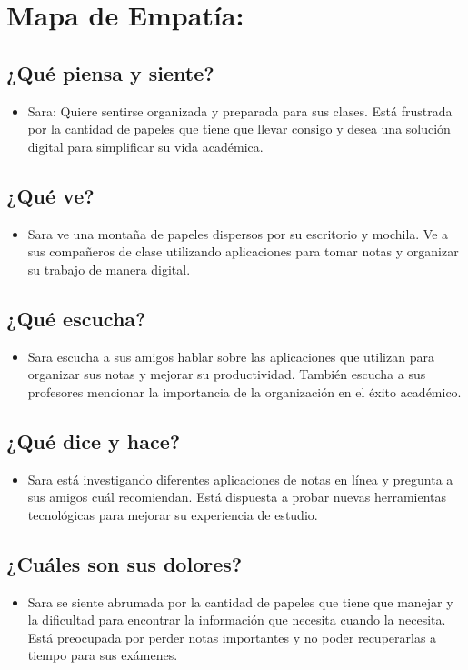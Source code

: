 \section{Mapa de Empatía:}

\subsection*{¿Qué piensa y siente?}
\begin{itemize}
    \item Sara: Quiere sentirse organizada y preparada para sus clases. Está frustrada por la cantidad de papeles que tiene que llevar consigo y desea una solución digital para simplificar su vida académica.
\end{itemize}

\subsection*{¿Qué ve?}
\begin{itemize}
    \item Sara ve una montaña de papeles dispersos por su escritorio y mochila. Ve a sus compañeros de clase utilizando aplicaciones para tomar notas y organizar su trabajo de manera digital.
\end{itemize}

\subsection*{¿Qué escucha?}
\begin{itemize}
    \item Sara escucha a sus amigos hablar sobre las aplicaciones que utilizan para organizar sus notas y mejorar su productividad. También escucha a sus profesores mencionar la importancia de la organización en el éxito académico.
\end{itemize}

\subsection*{¿Qué dice y hace?}
\begin{itemize}
    \item Sara está investigando diferentes aplicaciones de notas en línea y pregunta a sus amigos cuál recomiendan. Está dispuesta a probar nuevas herramientas tecnológicas para mejorar su experiencia de estudio.
\end{itemize}

\subsection*{¿Cuáles son sus dolores?}
\begin{itemize}
    \item Sara se siente abrumada por la cantidad de papeles que tiene que manejar y la dificultad para encontrar la información que necesita cuando la necesita. Está preocupada por perder notas importantes y no poder recuperarlas a tiempo para sus exámenes.
\end{itemize}

